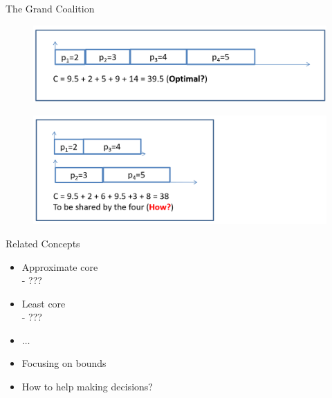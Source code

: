 \documentclass[14pt]{beamer}
\begin{document}
\begin{frame}{The Grand Coalition}

  \begin{figure}[H]
  \centering
  \includegraphics[width=1\textwidth]{Grand1.png}
  \end{figure}
  \centering

  \begin{figure}[htb]
  \includegraphics[width=1\textwidth]{Grand2.png}
  \end{figure}

\end{frame}


\begin{frame}{Related Concepts}
\begin{itemize}
\normalsize
	\item Approximate core \\
  \vspace{0.25em}
  - ???
	\item Least core \\
  \vspace{0.25em}
  - ???
  \item $\ldots$\\
  \vspace{1em}
  \item Focusing on bounds
  \vspace{0.25em}
  \item How to help making decisions?

\end{itemize}
\end{frame}
\end{document}
